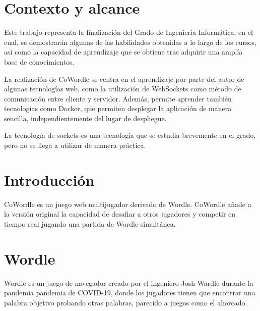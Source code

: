 \section{Contexto y alcance}

Este trabajo representa la finalización del Grado de Ingeniería Informática, en el cual, se demostrarán algunas de las habilidades obtenidas a lo largo de los cursos, así como la capacidad de aprendizaje que se obtiene tras adquirir una amplía base de conocimientos.

La realización de CoWordle se centra en el aprendizaje por parte del autor de algunas tecnologías web, como la utilización de WebSockets como método de comunicación entre cliente y servidor.  Además, permite aprender también tecnologías como Docker, que permiten desplegar la aplicación de manera sencilla, independientemente del lugar de despliegue.

La tecnología de sockets es una tecnología que se estudia brevemente en el grado, pero no se llega a utilizar de manera práctica.


\section{Introducción}
CoWordle es un juego web multijugador derivado de Wordle. CoWordle añade a la versión original la capacidad de desafiar a otros jugadores y competir en tiempo real jugando una partida de Wordle simultánea.


\section{Wordle}
Wordle es un juego de navegador creado por el ingeniero Josh Wardle durante la pandemia pandemia de COVID-19, donde los jugadores tienen que encontrar una palabra objetivo probando otras palabras, parecido a juegos como el ahorcado.

